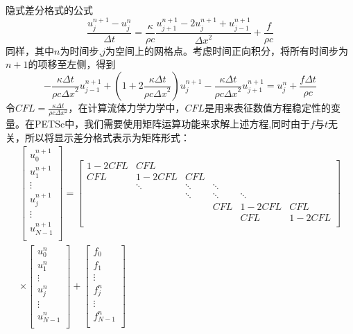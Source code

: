 \documentclass{article}
\begin{document}
		隐式差分格式的公式
		$$
		\frac{u^{n+1}_j-u^n_j}{\Delta t}=\frac{\kappa }{\rho  c}\frac{u^{n+1}_{j+1}-2u^{n+1}_j+u^{n+1}_{j-1}}{{\Delta x}^2}+\frac{f}{\rho c}
		$$
		同样，其中$n$为时间步,$j$为空间上的网格点。考虑时间正向积分，将所有时间步为$n+1$的项移至左侧，得到
		$$-\frac{\kappa \Delta t}{\rho c {\Delta x}^2}u^{n+1}_{j-1}+(1+2\frac{\kappa \Delta t}{\rho c {\Delta x}^2})u^{n+1}_j-\frac{\kappa \Delta t}{\rho c {\Delta x}^2}u^{n+1}_{j+1}=u^{n}_j+\frac{f\Delta t}{\rho c}
		$$
		令$CFL=\frac{\kappa \Delta t}{\rho  c \Delta x^2}$，在计算流体力学力学中，$CFL$是用来表征数值方程稳定性的变量。在PETSc中，我们需要使用矩阵运算功能来求解上述方程,同时由于$f$与$t$无关，所以将显示差分格式表示为矩阵形式：
		$$
		\begin{aligned}
		\begin{bmatrix}
			u_0^{n+1} \\
			u_1^{n+1} \\
			\vdots \\
			u_j^{n+1} \\
			\vdots \\
			u_{N-1}^{n+1} \\
		\end{bmatrix}
		=
		\begin{bmatrix}
			1-2CFL & CFL & & & & \\
			CFL & 1-2CFL & CFL & & &\\
			 & \ddots &  \ddots & \ddots & &\\
			 & & \ddots & \ddots & \ddots &\\
			 & & & CFL & 1-2CFL & CFL \\
			 & & & & CFL & 1-2CFL\\
		\end{bmatrix}
		\\
		\times
	    \begin{bmatrix}
	    	u_0^n \\
	    	u_1^n \\
	    	\vdots \\
	        u_j^n \\
	    	\vdots \\
	    	u_{N-1}^n \\
	    \end{bmatrix}+
     	\begin{bmatrix}
    		f_0 \\
    		f_1 \\
    		\vdots \\
    		f_j^n \\
    		\vdots \\
    		f_{N-1}^n \\
    	\end{bmatrix}
    	\end{aligned}
		$$
\end{document}
